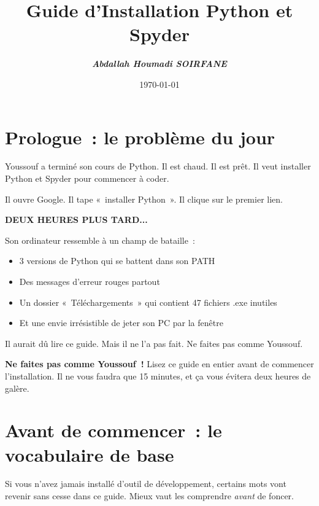 \documentclass[12pt,a4paper]{article}
\title{\Huge\textbf{Guide d'Installation Python et Spyder}}
\author{\Large\textbf{\textit{Abdallah Houmadi SOIRFANE}}}
\date{\Large \today}
\begin{document}
	
	\maketitle
	
	
	\section*{Prologue~: le problème du jour}
	
	Youssouf a terminé son cours de Python. Il est chaud. Il est prêt. Il veut installer Python et Spyder pour commencer à coder.
	
	Il ouvre Google. Il tape «~installer Python~». Il clique sur le premier lien.
	
	\textbf{DEUX HEURES PLUS TARD...}
	
	Son ordinateur ressemble à un champ de bataille~:
	\begin{itemize}
		\item 3 versions de Python qui se battent dans son PATH
		\item Des messages d'erreur rouges partout
		\item Un dossier «~Téléchargements~» qui contient 47 fichiers .exe inutiles
		\item Et une envie irrésistible de jeter son PC par la fenêtre
	\end{itemize}
	
	Il aurait dû lire ce guide. Mais il ne l'a pas fait. Ne faites pas comme Youssouf.
	
	\begin{attention}
		\textbf{Ne faites pas comme Youssouf~!} Lisez ce guide en entier avant de commencer l'installation. Il ne vous faudra que 15 minutes, et ça vous évitera deux heures de galère.
	\end{attention}
	
	\section{Avant de commencer~: le vocabulaire de base}
	
	Si vous n'avez jamais installé d'outil de développement, certains mots vont revenir sans cesse dans ce guide. Mieux vaut les comprendre \emph{avant} de foncer.
	
\end{document}
